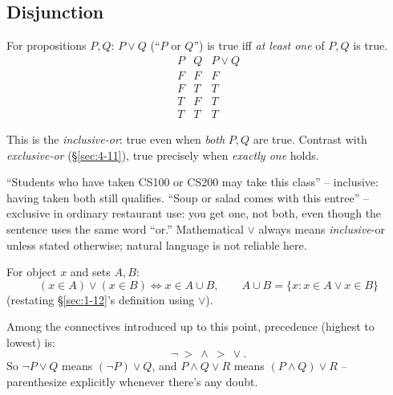 \subsection{Disjunction}
\label{sec:4-7}

\begin{definition}[Disjunction]
For propositions $P,Q$: $P \vee Q$ (``$P$ or $Q$'') is true iff \emph{at least one} of $P,Q$ is true.
\[
\begin{array}{cc|c}
P & Q & P \vee Q \\ \hline
F & F & F \\
F & T & T \\
T & F & T \\
T & T & T
\end{array}
\]
\end{definition}

\begin{note}
This is the \emph{inclusive-or}: true even when \emph{both} $P,Q$ are true. Contrast with \emph{exclusive-or} (\S\ref{sec:4-11}), true precisely when \emph{exactly one} holds.
\end{note}

\begin{example}
``Students who have taken CS100 or CS200 may take this class'' -- inclusive: having taken both still qualifies. ``Soup or salad comes with this entree'' -- exclusive in ordinary restaurant use: you get one, not both, even though the sentence uses the same word ``or.'' Mathematical $\vee$ always means \emph{inclusive}-or unless stated otherwise; natural language is not reliable here.
\end{example}

\begin{note}
For object $x$ and sets $A,B$:
\[
(x \in A) \vee (x \in B) \iff x \in A \cup B, \qquad A \cup B = \{x : x\in A \vee x \in B\}
\]
(restating \S\ref{sec:1-12}'s definition using $\vee$).
\end{note}

\begin{note}
Among the connectives introduced up to this point, precedence (highest to lowest) is:
\[
\neg \ > \ \wedge \ > \ \vee.
\]
So $\neg P \vee Q$ means $(\neg P) \vee Q$, and $P \wedge Q \vee R$ means $(P \wedge Q) \vee R$ -- parenthesize explicitly whenever there's any doubt.
\end{note}


